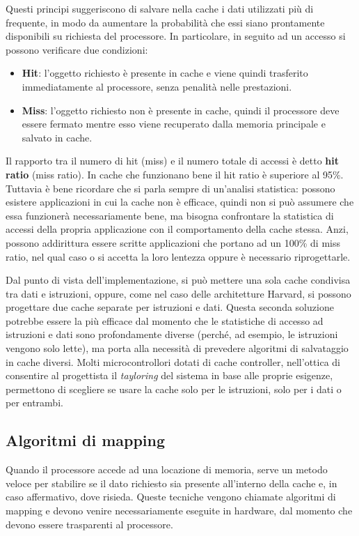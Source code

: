 \documentclass[11pt,4paper]{report}
\begin{document}
Questi principi suggeriscono di salvare nella cache i dati utilizzati più di frequente, in modo da aumentare la probabilità che essi siano prontamente disponibili su richiesta del processore. In particolare, in seguito ad un accesso si possono verificare due condizioni:
\begin{itemize}
\item \textbf{Hit}: l'oggetto richiesto è presente in cache e viene quindi trasferito immediatamente al processore, senza penalità nelle prestazioni.
\item \textbf{Miss}: l'oggetto richiesto non è presente in cache, quindi il processore deve essere fermato mentre esso viene recuperato dalla memoria principale e salvato in cache.
\end{itemize}
Il rapporto tra il numero di hit (miss) e il numero totale di accessi è detto \textbf{hit ratio} (miss ratio). In cache che funzionano bene il hit ratio è superiore al 95\%. Tuttavia è bene ricordare che si parla sempre di un'analisi statistica: possono esistere applicazioni in cui la cache non è efficace, quindi non si può assumere che essa funzionerà necessariamente bene, ma bisogna confrontare la statistica di accessi della propria applicazione con il comportamento della cache stessa. Anzi, possono addirittura essere scritte applicazioni che portano ad un 100\% di miss ratio, nel qual caso o si accetta la loro lentezza oppure è necessario riprogettarle.

Dal punto di vista dell'implementazione, si può mettere una sola cache condivisa tra dati e istruzioni, oppure, come nel caso delle architetture Harvard, si possono progettare due cache separate per istruzioni e dati. Questa seconda soluzione potrebbe essere la più efficace dal momento che le statistiche di accesso ad istruzioni e dati sono profondamente diverse (perché, ad esempio, le istruzioni vengono solo lette), ma porta alla necessità di prevedere algoritmi di salvataggio in cache diversi. Molti microcontrollori dotati di cache controller, nell'ottica di consentire al progettista il \emph{tayloring} del sistema in base alle proprie esigenze, permettono di scegliere se usare la cache solo per le istruzioni, solo per i dati o per entrambi.

\subsection{Algoritmi di mapping}
Quando il processore accede ad una locazione di memoria, serve un metodo veloce per stabilire se il dato richiesto sia presente all'interno della cache e, in caso affermativo, dove risieda. Queste tecniche vengono chiamate algoritmi di mapping e devono venire necessariamente eseguite in hardware, dal momento che devono essere trasparenti al processore.
\end{document}

